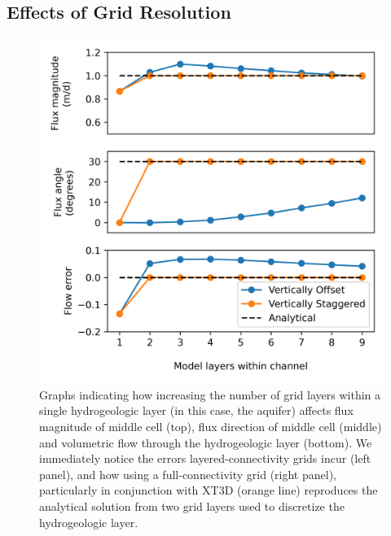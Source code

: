 \documentclass{article}
\begin{document}
\subsection{Effects of Grid Resolution}

\begin{figure}
	\begin{center}
	\includegraphics[scale=0.9]{../figures/fig3paper.png}
	\caption{Graphs indicating how increasing the number of grid layers within a single hydrogeologic layer (in this case, the aquifer) affects flux magnitude of middle cell (top), flux direction of middle cell (middle) and volumetric flow through the hydrogeologic layer (bottom). We immediately notice the errors layered-connectivity grids incur (left panel), and how using a full-connectivity grid (right panel), particularly in conjunction with XT3D (orange line) reproduces the analytical solution from two grid layers used to discretize the hydrogeologic layer.}
	\label{fig:fig3}
	\end{center}
\end{figure}
\end{document}
